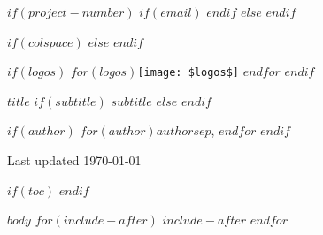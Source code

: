 \documentclass[$if(fontsize)$$fontsize$,$endif$$if(lang)$$lang$,$endif$$if(papersize)$$papersize$,$endif$$for(classoption)$$classoption$$sep$,$endfor$]{$documentclass$}
\begin{document}
$if(project-number)$
\pagestyle{fancy}
\fancyhf{}
\cfoot{\thepage}
$if(email)$
$endif$
$else$
\pagestyle{plain}
$endif$

$if(colspace)$
\setlength{\tabcolsep}{$colspace$}
$else$
\setlength{\tabcolsep}{12pt}
$endif$

$if(logos)$
$for(logos)$\texttt{[image: \$logos\$]} \hspace*{0.2cm} $endfor$
\hfill
$endif$

\Large
{\sbf $title$}\newline
$if(subtitle)$
{\sf\normalsize $subtitle$}
$else$
$endif$

\sf\normalsize{
$if(author)$
$for(author)$$author$$sep$, $endfor$\newline
$endif$
}

Last updated \today
\vspace{5mm}



$if(toc)$
\setcounter{page}{1}
\setcounter{tocdepth}{2}
\tableofcontents
$endif$


$body$
$for(include-after)$
$include-after$
$endfor$
\end{document}
